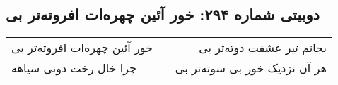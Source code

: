 \begin{center}
\section*{دوبیتی شماره ۲۹۴: خور آئین چهره‌ات افروته‌تر بی}
\label{sec:294}
\begin{longtable}{l p{0.5cm} r}
خور آئین چهره‌ات افروته‌تر بی
&&
بجانم تیر عشقت دوته‌تر بی
\\
چرا خال رخت دونی سیاهه
&&
هر آن نزدیک خور بی سوته‌تر بی
\\
\end{longtable}
\end{center}
